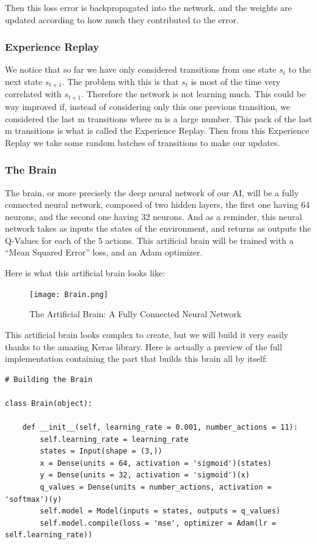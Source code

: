 \documentclass[]{book}
\begin{document}
Then this loss error is backpropagated into the network, and the weights are updated according to how much they contributed to the error.

\subsubsection{Experience Replay}

We notice that so far we have only considered transitions from one state \(s_t\) to the next state \(s_{t+1}\). The problem with this is that \(s_t\) is most of the time very correlated with \(s_{t+1}\). Therefore the network is not learning much. This could be way improved if, instead of considering only this one previous transition, we considered the last m transitions where m is a large number. This pack of the last m transitions is what is called the Experience Replay. Then from this Experience Replay we take some random batches of transitions to make our updates.

\subsubsection{The Brain}

The brain, or more precisely the deep neural network of our AI, will be a fully connected neural network, composed of two hidden layers, the first one having 64 neurons, and the second one having 32 neurons. And as a reminder, this neural network takes as inputs the states of the environment, and returns as outputs the Q-Values for each of the 5 actions. This artificial brain will be trained with a ``Mean Squared Error'' loss, and an Adam optimizer.

Here is what this artificial brain looks like:

\begin{figure}[!htbp]
        \begin{center}
            \texttt{[image: Brain.png]}
            \caption{The Artificial Brain: A Fully Connected Neural Network}
        \end{center}
\end{figure}

This artificial brain looks complex to create, but we will build it very easily thanks to the amazing Keras library. Here is actually a preview of the full implementation containing the part that builds this brain all by itself:

\begin{lstlisting}
# Building the Brain

class Brain(object):

    def __init__(self, learning_rate = 0.001, number_actions = 11):
        self.learning_rate = learning_rate
        states = Input(shape = (3,))
        x = Dense(units = 64, activation = 'sigmoid')(states)
        y = Dense(units = 32, activation = 'sigmoid')(x)
        q_values = Dense(units = number_actions, activation = 'softmax')(y)
        self.model = Model(inputs = states, outputs = q_values)
        self.model.compile(loss = 'mse', optimizer = Adam(lr = self.learning_rate))
\end{lstlisting}
\end{document}
